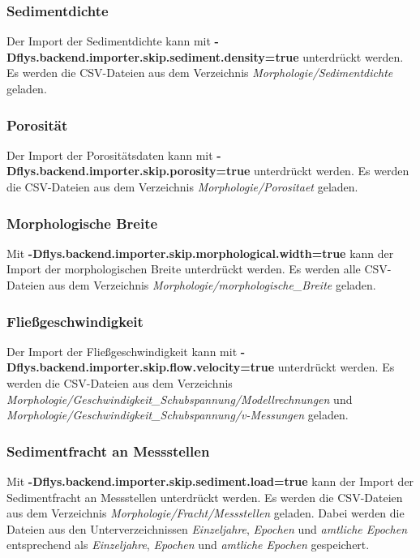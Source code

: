 \subsubsection{Sedimentdichte}
Der Import der Sedimentdichte kann mit
\textbf{-Dflys.backend.importer.skip.sediment.density=true}
unterdrückt werden. Es werden die CSV-Dateien aus dem Verzeichnis
\textit{Morphologie/Sedimentdichte} geladen.

\subsubsection{Porosität}
Der Import der Porositätsdaten kann mit
\textbf{-Dflys.backend.importer.skip.porosity=true}
unterdrückt werden. Es werden die CSV-Dateien aus dem Verzeichnis
\textit{Morphologie/Porositaet} geladen.

\subsubsection{Morphologische Breite}
Mit \textbf{-Dflys.backend.importer.skip.morphological.width=true}
kann der Import der morphologischen Breite unterdrückt werden.
Es werden alle CSV-Dateien aus dem Verzeichnis
\textit{Morphologie/morphologische\_Breite} geladen.

\subsubsection{Fließgeschwindigkeit}
Der Import der Fließgeschwindigkeit kann mit
\textbf{-Dflys.backend.importer.skip.flow.velocity=true}
unterdrückt werden. Es werden die CSV-Dateien aus dem Verzeichnis\\
\textit{Morphologie/Geschwindigkeit\_Schubspannung/Modellrechnungen} und\\
\textit{Morphologie/Geschwindigkeit\_Schubspannung/v-Messungen} geladen.

\subsubsection{Sedimentfracht an Messstellen}
Mit
\textbf{-Dflys.backend.importer.skip.sediment.load=true}
kann der Import der Sedimentfracht an Messstellen unterdrückt werden.
Es werden die CSV-Dateien aus dem Verzeichnis
\textit{Morphologie/Fracht/Messstellen} geladen.
Dabei werden die Dateien aus den
Unterverzeichnissen \textit{Einzeljahre}, \textit{Epochen}
und \textit{amtliche Epochen} entsprechend als
\textit{Einzeljahre}, \textit{Epochen} und
\textit{amtliche Epochen} gespeichert.

